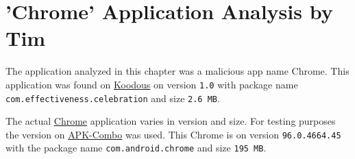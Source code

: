 \section{'Chrome' Application Analysis by Tim}

The application analyzed in this chapter was a malicious app name Chrome.
This application was found on \href{https://koodous.com/apks/ef613e042afafb955baedc75033f6ff73d19a795ae7f541981dfe624bc700887}{Koodous} 
on version \texttt{1.0} with package name \texttt{com.effectiveness.celebration} and size \texttt{2.6 MB}.

The actual \href{https://play.google.com/store/apps/details?id=com.android.chrome&hl=en&gl=US}{Chrome} application varies in version and size. 
For testing purposes the version on \href{https://apkcombo.com/nl/chrome/com.android.chrome/}{APK-Combo} was used.
This Chrome is on version \texttt{96.0.4664.45} with the package name \texttt{com.android.chrome} and size \texttt{195 MB}.















